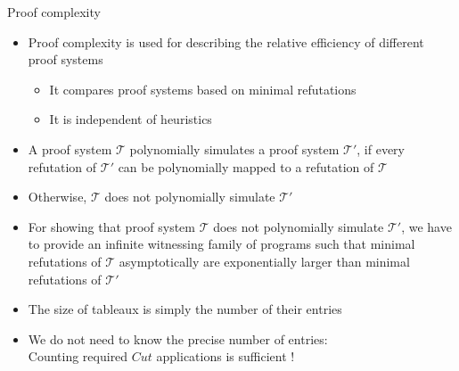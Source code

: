 \begin{frame}{Proof complexity}
  \begin{itemize}
  \item<1-> \alert{Proof complexity} is used for describing the relative efficiency of different proof systems
    \begin{itemize}
    \item<2-> [] It compares proof systems based on \alert{minimal refutations}
    \item<2-> [] It is independent of heuristics
    \end{itemize}
  \item<3-> A proof system ${\mathcal{T}}$ \alert{polynomially simulates} a proof system ${\mathcal{T}}'$,
    if every refutation of ${\mathcal{T}}'$ can be polynomially mapped to a refutation of ${\mathcal{T}}$
  \item<3-> [] Otherwise, ${\mathcal{T}}$ does not polynomially simulate ${\mathcal{T}}'$
  \item<4-> For showing that proof system ${\mathcal{T}}$ does not polynomially simulate ${\mathcal{T}}'$,
    we have to provide an infinite \alert{witnessing family} of programs such that minimal
    refutations of ${\mathcal{T}}$ asymptotically are exponentially larger than minimal refutations of ${\mathcal{T}}'$
  \item<4-> [] The size of tableaux is simply the number of their entries
  \item<5-> We do not need to know the precise number of entries:\\
    \alert{Counting required $\textit{Cut}$ applications is sufficient !}
  \end{itemize}
\end{frame}
